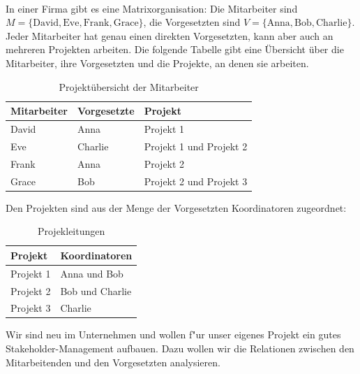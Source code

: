 \\
In einer Firma gibt es eine Matrixorganisation: Die Mitarbeiter sind $M=\{\text{David},\text{Eve},\text{Frank}, \text{Grace}\}$, die Vorgesetzten sind $V=\{\text{Anna},\text{Bob},\text{Charlie}\}$. Jeder Mitarbeiter hat genau einen direkten Vorgesetzten, kann aber auch an mehreren Projekten arbeiten. Die folgende Tabelle gibt eine Übersicht über die Mitarbeiter, ihre Vorgesetzten und die Projekte, an denen sie arbeiten.
\begin{table}[h]
    \centering
    \caption{Projektübersicht der Mitarbeiter}
    \begin{tabular}{lll}
        \toprule
        \textbf{Mitarbeiter} & \textbf{Vorgesetzte} & \textbf{Projekt} \\
        \midrule
        David & Anna    & Projekt 1 \\
        Eve    & Charlie & Projekt 1 und Projekt 2 \\
        Frank  & Anna    & Projekt 2 \\
        Grace  & Bob     & Projekt 2 und Projekt 3 \\
        \bottomrule
    \end{tabular}
\end{table}
Den Projekten sind aus der Menge der Vorgesetzten Koordinatoren zugeordnet:
\begin{table}[h]
    \centering
    \caption{Projekleitungen}
    \begin{tabular}{ll}
        \toprule
        \textbf{Projekt} & \textbf{Koordinatoren}\\
        \midrule
        Projekt 1 & Anna und Bob    \\
        Projekt 2 & Bob und Charlie    \\
        Projekt 3 & Charlie     \\
        \bottomrule
    \end{tabular}
\end{table}
Wir sind neu im Unternehmen und wollen f"ur unser eigenes Projekt ein gutes Stakeholder-Management aufbauen. Dazu wollen wir die Relationen zwischen den Mitarbeitenden und den Vorgesetzten analysieren. 
